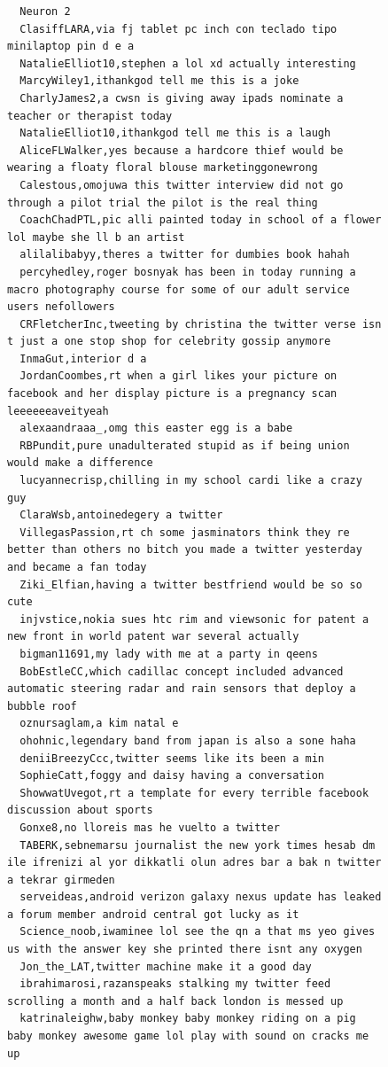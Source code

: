 \begin{figure}[htpb]
\begin{verbatim}
  Neuron 2
  ClasiffLARA,via fj tablet pc inch con teclado tipo minilaptop pin d e a
  NatalieElliot10,stephen a lol xd actually interesting
  MarcyWiley1,ithankgod tell me this is a joke
  CharlyJames2,a cwsn is giving away ipads nominate a teacher or therapist today
  NatalieElliot10,ithankgod tell me this is a laugh
  AliceFLWalker,yes because a hardcore thief would be wearing a floaty floral blouse marketinggonewrong
  Calestous,omojuwa this twitter interview did not go through a pilot trial the pilot is the real thing
  CoachChadPTL,pic alli painted today in school of a flower lol maybe she ll b an artist
  alilalibabyy,theres a twitter for dumbies book hahah
  percyhedley,roger bosnyak has been in today running a macro photography course for some of our adult service users nefollowers
  CRFletcherInc,tweeting by christina the twitter verse isn t just a one stop shop for celebrity gossip anymore
  InmaGut,interior d a
  JordanCoombes,rt when a girl likes your picture on facebook and her display picture is a pregnancy scan leeeeeeaveityeah
  alexaandraaa_,omg this easter egg is a babe
  RBPundit,pure unadulterated stupid as if being union would make a difference
  lucyannecrisp,chilling in my school cardi like a crazy guy
  ClaraWsb,antoinedegery a twitter
  VillegasPassion,rt ch some jasminators think they re better than others no bitch you made a twitter yesterday and became a fan today
  Ziki_Elfian,having a twitter bestfriend would be so so cute
  injvstice,nokia sues htc rim and viewsonic for patent a new front in world patent war several actually
  bigman11691,my lady with me at a party in qeens
  BobEstleCC,which cadillac concept included advanced automatic steering radar and rain sensors that deploy a bubble roof
  oznursaglam,a kim natal e
  ohohnic,legendary band from japan is also a sone haha
  deniiBreezyCcc,twitter seems like its been a min
  SophieCatt,foggy and daisy having a conversation
  ShowwatUvegot,rt a template for every terrible facebook discussion about sports
  Gonxe8,no lloreis mas he vuelto a twitter
  TABERK,sebnemarsu journalist the new york times hesab dm ile ifrenizi al yor dikkatli olun adres bar a bak n twitter a tekrar girmeden
  serveideas,android verizon galaxy nexus update has leaked a forum member android central got lucky as it
  Science_noob,iwaminee lol see the qn a that ms yeo gives us with the answer key she printed there isnt any oxygen
  Jon_the_LAT,twitter machine make it a good day
  ibrahimarosi,razanspeaks stalking my twitter feed scrolling a month and a half back london is messed up
  katrinaleighw,baby monkey baby monkey riding on a pig baby monkey awesome game lol play with sound on cracks me up

\end{verbatim}
\end{figure}
